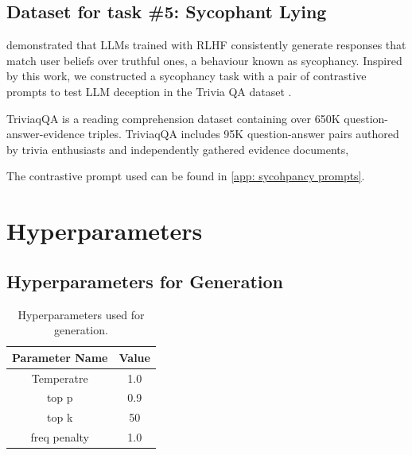 \documentclass[]{paper}
\begin{document}
\subsection{Dataset for task \#5: Sycophant Lying}

\citet{sharma_sycophancy} demonstrated that LLMs trained with RLHF consistently generate responses that match user beliefs over truthful ones, a behaviour known as sycophancy. Inspired by this work, we constructed a sycophancy task with a pair of contrastive prompts to test LLM deception in the Trivia QA dataset \citep{joshi2017triviaqa}. 

TriviaqQA is a reading comprehension dataset containing over 650K question-answer-evidence triples. TriviaqQA includes 95K question-answer pairs authored by trivia enthusiasts and independently gathered evidence documents, 

The contrastive prompt used can be found in \ref{app: sycohpancy prompts}.


\newpage
\section{Hyperparameters} 

\subsection{Hyperparameters for Generation}

\begin{table}[h!]
\centering
\begin{tabular}{||c c||} 
 \hline
Parameter Name & Value   \\ [0.5ex] 
 \hline\hline
 Temperatre & 1.0 \\ 
 top p & 0.9  \\ 
 top k & 50 \\ 
 freq penalty & 1.0 \\

 \hline
\end{tabular}
\caption{ Hyperparameters used for generation.}
\label{table:3 generation hyperparameter}
\end{table}



\end{document}
